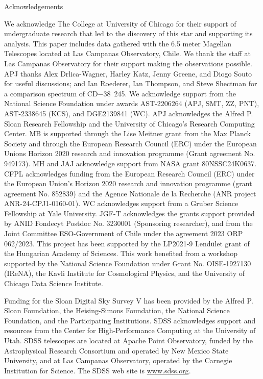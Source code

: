 \documentclass{natureprintstyle}
\newcommand{\cdstar}{CD$-$38~245\xspace}
\begin{document}
\begin{addendum}
  
\item [Acknowledgements] 

We acknowledge The College at University of Chicago for their support of undergraduate research that led to the discovery of this star and supporting its analysis.
This paper includes data gathered with the 6.5 meter Magellan Telescopes located at Las Campanas Observatory, Chile. We thank the staff at Las Campanas Observatory for their support making the observations possible.
APJ thanks Alex Drlica-Wagner, Harley Katz, Jenny Greene, and Diogo Souto for useful discussions; 
and Ian Roederer, Ian Thompson, and Steve Shectman for a comparison spectrum of \cdstar.
We acknowledge support from the National Science Foundation under awards 
AST-2206264 (APJ, SMT, ZZ, PNT),
AST-2338645 (KCS),
and DGE2139841 (WC).
APJ acknowledges the Alfred P. Sloan Research Fellowship and the University of Chicago's Research Computing Center.
MB is supported through the Lise Meitner grant from the Max Planck Society and through the European Research Council (ERC) under the European Unions Horizon 2020 research and innovation programme (Grant agreement No. 949173). 
MH and JAJ acknowledge support from NASA grant 80NSSC24K0637.
CFPL acknowledges funding from the European Research Council (ERC) under the European Union’s Horizon 2020 research and innovation programme (grant agreement No. 852839) and the Agence Nationale de la Recherche (ANR project ANR-24-CPJ1-0160-01).
WC acknowledges support from a Gruber Science Fellowship at Yale University.
JGF-T acknowledges the grants support provided by ANID Fondecyt Postdoc No. 3230001 (Sponsoring researcher), and from the Joint Committee ESO-Government of Chile under the agreement 2023 ORP 062/2023. 
This project has been supported by the LP2021-9 Lend\"ulet grant of the Hungarian Academy of Sciences.
This work benefited from a workshop supported by the National Science Foundation under Grant No. OISE-1927130 (IReNA), the Kavli Institute for Cosmological Physics, and the University of Chicago Data Science Institute. 

Funding for the Sloan Digital Sky Survey V has been provided by the Alfred P. Sloan Foundation, the Heising-Simons Foundation, the National Science Foundation, and the Participating Institutions. SDSS acknowledges support and resources from the Center for High-Performance Computing at the University of Utah. SDSS telescopes are located at Apache Point Observatory, funded by the Astrophysical Research Consortium and operated by New Mexico State University, and at Las Campanas Observatory, operated by the Carnegie Institution for Science. The SDSS web site is \url{www.sdss.org}.


\end{addendum}
\end{document}

